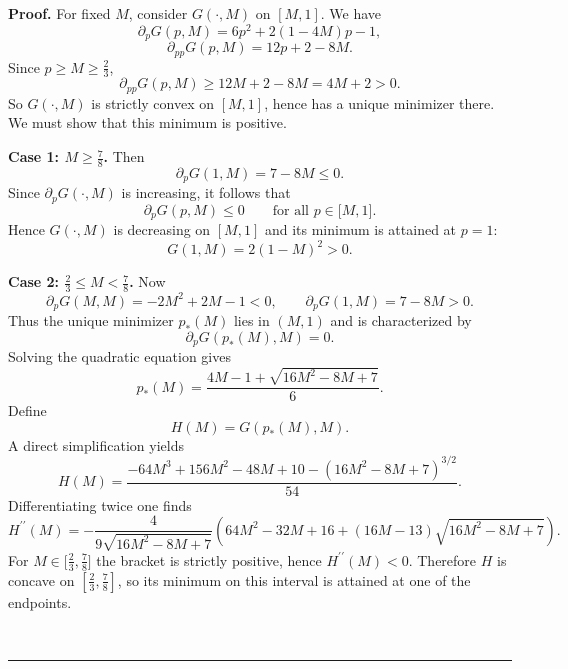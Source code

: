 \documentclass[onecolumn]{article}
\newenvironment{proof}[1][Proof]{\noindent\textbf{#1.} }{\ \rule{0.5em}{0.5em}}
\begin{document}
\begin{proof}
\noindent For fixed $M$, consider $G(\cdot ,M)$ on $[M,1]$. We have 
\begin{equation}
\partial _{p}G(p,M)=6p^{2}+2(1-4M)p-1,  \label{1656}
\end{equation}%
\begin{equation}
\partial _{pp}G(p,M)=12p+2-8M.  \label{1657}
\end{equation}%
Since $p\geq M\geq \frac{2}{3}$, 
\begin{equation}
\partial _{pp}G(p,M)\geq 12M+2-8M=4M+2>0.  \label{1658}
\end{equation}%
So $G(\cdot ,M)$ is strictly convex on $[M,1]$, hence has a unique minimizer
there. We must show that this minimum is positive.

\textbf{Case 1: $M\geq \frac{7}{8}$.} Then 
\begin{equation}
\partial _{p}G(1,M)=7-8M\leq 0.  \label{1659}
\end{equation}%
Since $\partial _{p}G(\cdot ,M)$ is increasing, it follows that 
\begin{equation}
\partial _{p}G(p,M)\leq 0\qquad \text{for all }p\in \lbrack M,1].
\label{1660}
\end{equation}%
Hence $G(\cdot ,M)$ is decreasing on $[M,1]$ and its minimum is attained at $%
p=1$: 
\begin{equation}
G(1,M)=2(1-M)^{2}>0.  \label{1661}
\end{equation}

\textbf{Case 2: $\frac{2}{3}\leq M<\frac{7}{8}$.} Now 
\begin{equation}
\partial _{p}G(M,M)=-2M^{2}+2M-1<0,\qquad \partial _{p}G(1,M)=7-8M>0.
\label{1662}
\end{equation}%
Thus the unique minimizer $p_{\ast }(M)$ lies in $(M,1)$ and is
characterized by 
\begin{equation}
\partial _{p}G(p_{\ast }(M),M)=0.  \label{1663}
\end{equation}%
Solving the quadratic equation gives 
\begin{equation}
p_{\ast }(M)=\frac{4M-1+\sqrt{16M^{2}-8M+7}}{6}.  \label{1664}
\end{equation}%
Define 
\begin{equation}
H(M)=G(p_{\ast }(M),M).  \label{1665}
\end{equation}%
A direct simplification yields 
\begin{equation}
H(M)=\frac{-64M^{3}+156M^{2}-48M+10-(16M^{2}-8M+7)^{3/2}}{54}.  \label{1666}
\end{equation}%
Differentiating twice one finds 
\begin{equation}
H^{\prime \prime }(M)=-\frac{4}{9\sqrt{16M^{2}-8M+7}}(64M^{2}-32M+16+(16M-13)%
\sqrt{16M^{2}-8M+7}).  \label{1667}
\end{equation}%
For $M\in \lbrack \frac{2}{3},\frac{7}{8}]$ the bracket is strictly
positive, hence $H^{\prime \prime }(M)<0$. Therefore $H$ is concave on $[%
\frac{2}{3},\frac{7}{8}]$, so its minimum on this interval is attained at
one of the endpoints.


\end{proof}
\end{document}
